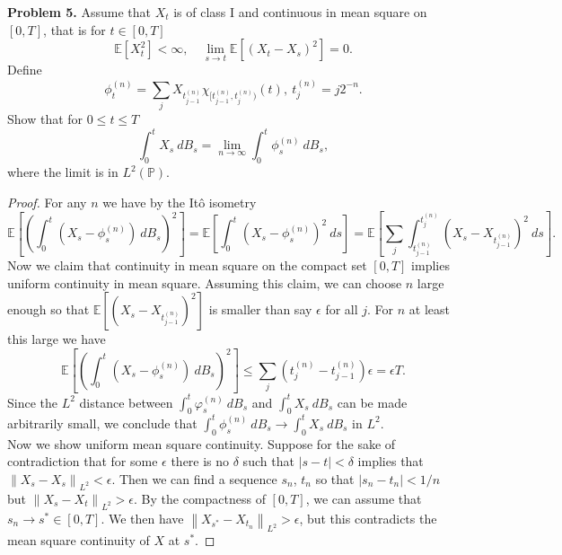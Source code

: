 \documentclass[11pt,letterpaper]{report}
\newcommand{\Lp}[2]{\left\|{#1}\right\|_{L^{#2}}}
\newcommand{\E}{\mathbb{E}}
\newcommand{\Prob}{\mathbb{P}}
\begin{document}
\noindent\textbf{Problem 5. }
Assume that $X_t$ is of class I and continuous in mean square on $[0, T]$, that is for $t\in [0, T]$
\[
\E[X_t^2]<\infty,\quad \lim_{s\to t}\E[(X_t-X_s)^2] = 0.
\]
Define
\[
\phi_t^{(n)} = \sum_jX_{t^{(n)}_{j-1}}\chi_{[t^{(n)}_{j-1}, t^{(n)}_j)}(t),\ t^{(n)}_j = j2^{-n}.
\]
Show that for $0\leq t\leq T$
\[
\int_0^tX_s\ dB_s = \lim_{n\to \infty}\int_0^t\phi^{(n)}_s\ dB_s,
\]
where the limit is in $L^2(\Prob)$.
\begin{proof}
	For any $n$ we have by the It\^o isometry
	\[
	\E\left[\left(\int_0^t(X_s - \phi^{(n)}_s)\ dB_s\right)^2\right] = \E\left[\int_0^t(X_s - \phi^{(n)}_s)^2\ ds\right] = \E\left[\sum_j\int_{t_{j-1}^{(n)}}^{t_j^{(n)}} (X_s - X_{t_{j-1}^{(n)}})^2\ ds \right].
	\]
	Now we claim that continuity in mean square on the compact set $[0, T]$ implies uniform continuity in mean square. Assuming this claim, we can choose $n$ large enough so that $\E[(X_s - X_{t_{j-1}^{(n)}})^2]$ is smaller than say $\epsilon$ for all $j$. For $n$ at least this large we have
	\[
	\E\left[\left(\int_0^t(X_s - \phi^{(n)}_s)\ dB_s\right)^2\right] \leq \sum_j(t_j^{(n)} - t_{j-1}^{(n)})\epsilon = \epsilon T.
	\]
	Since the $L^2$ distance between $\int_0^t\varphi_s^{(n)}\ dB_s$ and $\int_0^tX_s\ dB_s$ can be made arbitrarily small, we conclude that $\int_0^t \phi_s^{(n)}\ dB_s\to \int_0^tX_s\ dB_s$ in $L^2$.\\

	\noindent Now we show uniform mean square continuity. Suppose for the sake of contradiction that for some $\epsilon$ there is no $\delta$ such that $|s-t|<\delta$ implies that $\Lp{X_s - X_s}{2}<\epsilon$. Then we can find a sequence $s_n$, $t_n$ so that $|s_n-t_n|<1/n$ but $\Lp{X_s-X_t}{2}>\epsilon$. By the compactness of $[0, T]$, we can assume that $s_n\to s^*\in [0, T]$. We then have $\Lp{X_{s^*}-X_{t_n}}{2}>\epsilon$, but this contradicts the mean square continuity of $X$ at $s^*$.
\end{proof}
\end{document}

